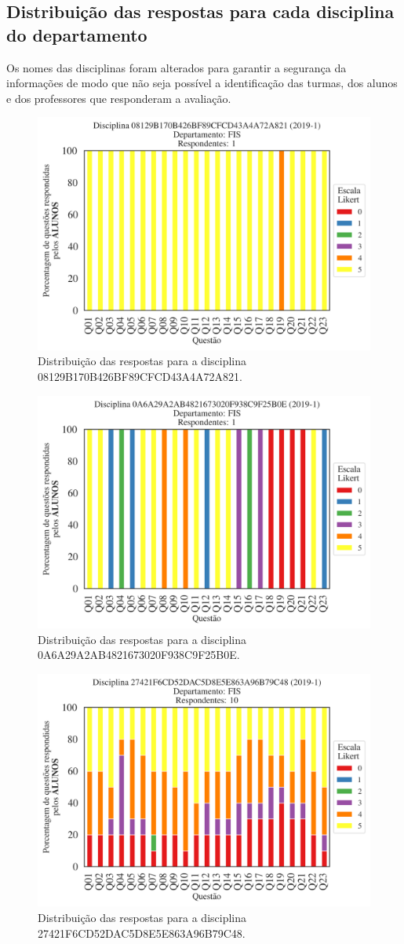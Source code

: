 \documentclass[a4paper,10pt]{article}
\begin{document}
\subsection{Distribuição das respostas para cada disciplina do departamento}

Os nomes das disciplinas foram alterados para garantir a segurança da informações de modo que não seja possível a identificação das turmas, dos alunos  e dos professores que responderam a avaliação.

\begin{figure}[h]
\centering
\includegraphics[width=0.485\linewidth]{analise_disciplina_departamento_FIS_ALUNO_TURMA_08129B170B426BF89CFCD43A4A72A821.png}
\caption{\label{fig:analise_geral_departamento}                Distribuição das respostas para a disciplina 08129B170B426BF89CFCD43A4A72A821.}
\end{figure}
\begin{figure}[h]
\centering
\includegraphics[width=0.485\linewidth]{analise_disciplina_departamento_FIS_ALUNO_TURMA_0A6A29A2AB4821673020F938C9F25B0E.png}
\caption{\label{fig:analise_geral_departamento}                Distribuição das respostas para a disciplina 0A6A29A2AB4821673020F938C9F25B0E.}
\end{figure}
\begin{figure}[h]
\centering
\includegraphics[width=0.485\linewidth]{analise_disciplina_departamento_FIS_ALUNO_TURMA_27421F6CD52DAC5D8E5E863A96B79C48.png}
\caption{\label{fig:analise_geral_departamento}                Distribuição das respostas para a disciplina 27421F6CD52DAC5D8E5E863A96B79C48.}
\end{figure}
\end{document}
